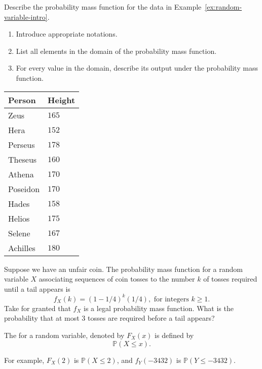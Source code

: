 \documentclass[../main.tex]{subfiles}
\begin{document}
\begin{example}
  Describe the probability mass function for the data in Example~\ref{ex:random-variable-intro}.  
  \begin{enumerate}
    \item Introduce appropriate notations.
    \item List all elements in the domain of the probability mass function.
    \item For every value in the domain, describe its output under the probability mass function.
  \end{enumerate}

  \hfill{}
  \begin{tabular}{l|l}
    Person & Height \\\midrule
    Zeus & \(165\) \\
    Hera & \(152\) \\
    Perseus & \(178\) \\
    Theseus & \(160\) \\
    Athena & \(170\) \\
    Poseidon  & \(170\) \\
    Hades & \(158\) \\
    Helios & \(175\) \\
    Selene & \(167\) \\
    Achilles & \(180\)
  \end{tabular}
\end{example}

\begin{example}
  Suppose we have an unfair coin. The probability mass function for a random variable \(X\) associating sequences of coin tosses to the number \(k\) of tosses required until a tail appears is
  \[
    f_{X}(k) = (1-1/4)^{k} (1/4),  \text{ for integers } k \ge 1.
  \]
  Take for granted that \(f_{X}\) is a legal probability mass function. What is the probability 
that at most \(3\) tosses are required before a tail appears?
\end{example}

\begin{definition}
  The  for a random variable, denoted by \(F_{X}(x)\) is defined by 
  \[
    \mathbb{P}(X \le x).
  \]

  For example, \(F_{X}(2)\) is \(\mathbb{P}(X \le 2)\), and \(f_{Y}(-3432)\) is \(\mathbb{P}(Y \le -3432)\).
\end{definition}
\end{document}
